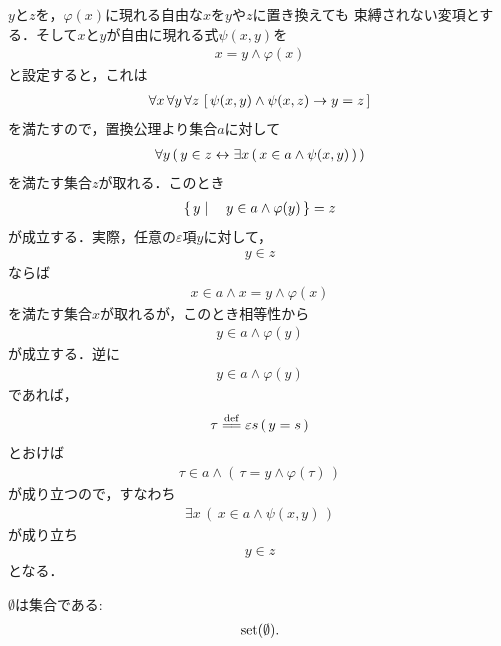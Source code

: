 	\begin{sketch}
		$y$と$z$を，$\varphi(x)$に現れる自由な$x$を$y$や$z$に置き換えても
		束縛されない変項とする．そして$x$と$y$が自由に現れる式$\psi(x,y)$を
		\begin{align}
			x = y \wedge \varphi(x)
		\end{align}
		と設定すると，これは
		\begin{align}
			\forall x\, \forall y\, \forall z\, 
			\left[\, \psi(x,y) \wedge \psi(x,z) \rightarrow y = z\, \right]
		\end{align}
		を満たすので，置換公理より集合$a$に対して
		\begin{align}
			\forall y\, (\, y \in z \leftrightarrow \exists x\, (\, x \in a \wedge 
			\psi(x,y)\, )\, )
		\end{align}
		を満たす集合$z$が取れる．このとき
		\begin{align}
			\left\{\, y \mid \quad y \in a \wedge \varphi(y)\, \right\} = z
		\end{align}
		が成立する．実際，任意の$\varepsilon$項$y$に対して，
		\begin{align}
			y \in z
		\end{align}
		ならば
		\begin{align}
			x \in a \wedge x = y \wedge \varphi(x)
		\end{align}
		を満たす集合$x$が取れるが，このとき相等性から
		\begin{align}
			y \in a \wedge \varphi(y)
		\end{align}
		が成立する．逆に
		\begin{align}
			y \in a \wedge \varphi(y)
		\end{align}
		であれば，
		\begin{align}
			\tau \defeq \varepsilon s\, (\, y = s\, )
		\end{align}
		とおけば
		\begin{align}
			\tau \in a \wedge (\, \tau = y \wedge \varphi(\tau)\, )
		\end{align}
		が成り立つので，すなわち
		\begin{align}
			\exists x\, (\, x \in a \wedge \psi(x,y)\, )
		\end{align}
		が成り立ち
		\begin{align}
			y \in z
		\end{align}
		となる．
		\QED
	\end{sketch}
	
	\begin{screen}
		\begin{thm}\label{thm:emptyset_is_a_set}
			$\emptyset$は集合である:
			\begin{align}
				\operatorname*{set} (\emptyset).
			\end{align}
		\end{thm}
	\end{screen}
	
